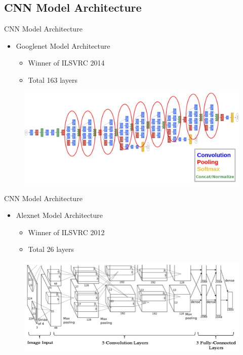 \documentclass[12pt]{beamer}
\begin{document}
\subsection{CNN Model Architecture}
\begin{frame}{CNN Model Architecture}
\begin{itemize}
	\item Googlenet Model Architecture
	\begin{itemize}
		\item Winner of ILSVRC 2014
		\item Total 163 layers
	\end{itemize}
\end{itemize}
\begin{figure}
\includegraphics[width=\textwidth]{images/googlenet_diagram}
\end{figure}
\end{frame}

\begin{frame}{CNN Model Architecture}
\begin{itemize}
	\item Alexnet Model Architecture
	\begin{itemize}
		\item Winner of ILSVRC 2012
		\item Total 26 layers
	\end{itemize}
\end{itemize}
\begin{figure}
\includegraphics[width=\textwidth]{images/Figure-5-AlexNet-Architecture}
\end{figure}
\end{frame}
\end{document}
